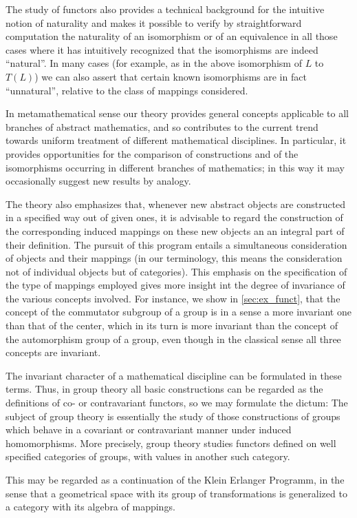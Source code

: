 \documentclass[11pt,a4paper]{report}
\begin{document}
The study of functors also provides a technical background for the intuitive notion of naturality and makes it
possible to verify by straightforward computation the naturality of an isomorphism or of an equivalence in
all those cases where it has intuitively recognized that the isomorphisms are indeed ``natural''. In many cases
(for example, as in the above isomorphism of $L$ to $T(L)$) we can also assert that certain known isomorphisms are
in fact ``unnatural'', relative to the class of mappings considered.

In metamathematical sense our theory provides general concepts applicable to all branches of abstract mathematics,
and so contributes to the current trend towards uniform treatment of different mathematical disciplines. In particular,
it provides opportunities for the comparison of constructions and of the isomorphisms occurring in different branches
of mathematics; in this way it may occasionally suggest new results by analogy.

The theory also emphasizes that, whenever new abstract objects are constructed in a specified way out of given ones,
it is advisable to regard the construction of the corresponding induced mappings on these new objects an an integral
part of their definition. The pursuit of this program entails a simultaneous consideration of objects and their
mappings (in our terminology, this means the consideration not of individual objects but of categories). This 
emphasis on the specification of the type of mappings employed gives more insight int the degree of invariance of 
the various concepts involved. For instance, we show in \cref{sec:ex_funct}, that the concept of the commutator
subgroup of a group is in a sense a more invariant one than that of the center, which in its turn is more invariant
than the concept of the automorphism group of a group, even though in the classical sense all three concepts are invariant.

The invariant character of a mathematical discipline can be formulated in these terms. Thus, in group theory all
basic constructions can be regarded as the definitions of co- or contravariant functors, so we may formulate the
dictum: The subject of group theory is essentially the study of those constructions of groups which behave in a
covariant or contravariant manner under induced homomorphisms. More precisely, group theory studies functors
defined on well specified categories of groups, with values in another such category.

This may be regarded as a continuation of the Klein Erlanger Programm, in the sense that a geometrical space with
its group of transformations is generalized to a category with its algebra of mappings.
\end{document}
